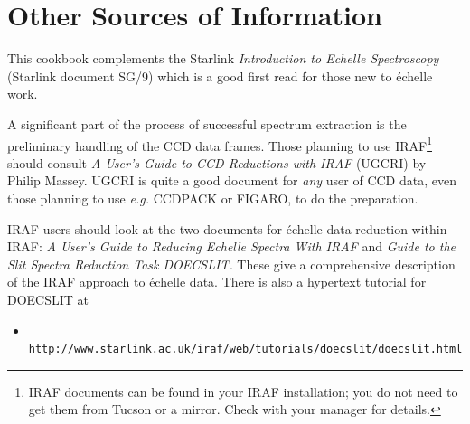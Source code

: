 \documentclass[twoside,11pt]{article}
\newcommand{\stardocinitials}  {SC}
\newcommand{\stardocnumber}    {3.2-0} %
\newcommand{\stardocname}{\stardocinitials /\stardocnumber}
\newcommand{\htmladdnormallink}[2]{#1}
\newcommand{\htmlref}[2]{#1}
\newcommand{\xref}[3]{#1}
\newcommand{\xlabel}[1]{}
\newcommand{\scspec}[2]{#1}
\newcommand{\scspec}[2]{#2}
\begin{document}
\section{\label{se_other_sources}\xlabel{other_information}Other Sources of
         Information}
\markboth{Other Sources of Information}{\stardocname}

This cookbook complements the Starlink \xref{{\sl Introduction to Echelle
Spectroscopy} (Starlink document SG/9)}{sg9}{} which is a good first read for
those new to \'{e}chelle work.

A significant part of the process of successful spectrum extraction
is the preliminary handling of the \htmlref{CCD}{gl_ccd} data frames.
Those planning to use
%
\htmladdnormallink{IRAF}
{http://www.starlink.ac.uk/iraf/web/}\scspec{\footnote{IRAF
documents can be found in your IRAF installation; you
do not need to get them from Tucson or a mirror.  Check with your manager for
details.}}{{\bf (All IRAF-related hyperlinks in this document are to the
UK-based Starlink IRAF mirror except \htmladdnormallink{this one}
{http://iraf.noao.edu/} which goes to the Tucson site.)}} should consult
\htmladdnormallink{{\sl A User's Guide to CCD Reductions with IRAF}}
{ftp://ftp.starlink.ac.uk/pub/iraf/iraf/docs/ccduser2.ps.Z} (UGCRI) by Philip Massey.
UGCRI is quite a good document for {\em any} user of CCD data, even those
planning to use {\em e.g.} \xref{CCDPACK}{sun139}{} or
\xref{FIGARO}{sun86}{}, to do the preparation.

IRAF users should look at the two documents for \'{e}chelle data reduction
within IRAF:
\htmladdnormallink{{\sl A User's Guide to Reducing Echelle Spectra With IRAF}}
{ftp://ftp.starlink.ac.uk/pub/iraf/iraf/docs/ech.ps.Z}
and
\htmladdnormallink{{\sl Guide to the Slit Spectra Reduction Task DOECSLIT.}}
{ftp://ftp.starlink.ac.uk/pub/iraf/iraf/docs/doecslit.ps.Z}
These give a comprehensive description of the IRAF approach to \'{e}chelle
data.  There is also a hypertext tutorial for DOECSLIT at

\begin{itemize}

\item \htmladdnormallink{{\tt
      http://www.starlink.ac.uk/iraf/web/tutorials/doecslit/doecslit.html}}
      {http://www.starlink.ac.uk/iraf/web/tutorials/doecslit/doecslit.html}

\end{itemize}
\end{document}
